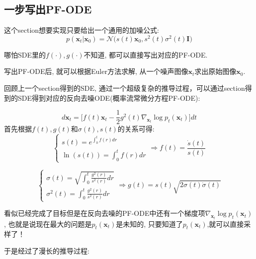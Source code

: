 \subsection{一步写出PF-ODE}

这个section想要实现只要给出一个通用的加噪公式:
$$
p(\mathbf{x}_{t}|\mathbf{x}_{0})=
\mathcal{N}\bigg(s(t)\mathbf{x}_{0}, s^{2}(t)\sigma^{2}(t)\mathbf{I}\bigg)
$$

哪怕SDE里的$f(\cdot ), g(\cdot)$不知道, 都可以直接写出对应的PF-ODE.

写出PF-ODE后, 就可以根据Euler方法求解, 从一个噪声图像$\mathbf{x}_{t}$求出原始图像$\mathbf{x}_{0}$.

\hspace*{\fill}

回顾上一个section得到的SDE, 通过一个超级复杂的推导过程，可以通过section得到的SDE得到对应的反向去噪ODE(概率流常微分方程PF-ODE):

$$
d\mathbf{x}_{t}=\bigg[f(t)\mathbf{x}_{t}-\frac{1}{2}g^{2}(t)\nabla_{\mathbf{x}_{t}}\log p_{t}(\mathbf{x}_{t})\bigg]dt
$$
首先根据$f(t), g(t)$和$\sigma(t), s(t)$的关系可得:
$$
\begin{cases}
s(t)=e^{\int_{0}^{t}f(r)dr}\\
\ln(s(t))=\int_{0}^{t}f(r)dr
\end{cases}\Longrightarrow
f(t)=\frac{\dot{s}(t)}{s(t)}
$$

$$
\begin{cases}
    \sigma(t)=\sqrt{\int_{0}^{t}\frac{g^{2}(r)}{s^{2}(r)}dr} \\
    \sigma^{2}(t)=\int_{0}^{t}\frac{g^{2}(r)}{s^{2}(r)}dr
\end{cases}\Longrightarrow
g(t)=s(t)\sqrt{2\sigma(t)\dot{\sigma}(t)}
$$

看似已经完成了目标但是在反向去噪的PF-ODE中还有一个梯度项$\nabla_{\mathbf{x}_{t}}\log p_{t}(\mathbf{x}_{t})$,
也就是说现在最大的问题是$p_{t}(\mathbf{x}_{t})$是未知的, 只要知道了$p_{t}(\mathbf{x}_{t})$,就可以直接采样了！

\hspace*{\fill}

于是经过了漫长的推导过程:

